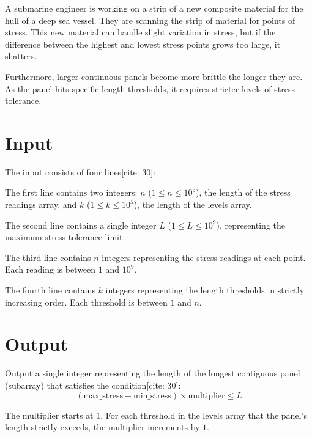 
A submarine engineer is working on a strip of a new composite material for the hull of a deep sea vessel. They are scanning the strip of material for points of stress. This new material can handle slight variation in stress, but if the difference between the highest and lowest stress points grows too large, it shatters. 

Furthermore, larger continuous panels become more brittle the longer they are. As the panel hits specific length thresholds, it requires stricter levels of stress tolerance.

\section*{Input}
The input consists of four lines[cite: 30]:

The first line contains two integers: $n$ ($1 \le n \le 10^5$), the length of the stress readings array, and $k$ ($1 \le k \le 10^5$), the length of the levels array.

The second line contains a single integer $L$ ($1 \le L \le 10^9$), representing the maximum stress tolerance limit.

The third line contains $n$ integers representing the stress readings at each point. Each reading is between $1$ and $10^9$.

The fourth line contains $k$ integers representing the length thresholds in strictly increasing order. Each threshold is between $1$ and $n$.

\section*{Output}
Output a single integer representing the length of the longest contiguous panel (subarray) that satisfies the condition[cite: 30]:
\[ (\text{max\_stress} - \text{min\_stress}) \times \text{multiplier} \le L \]

The multiplier starts at $1$. For each threshold in the levels array that the panel's length strictly exceeds, the multiplier increments by $1$.